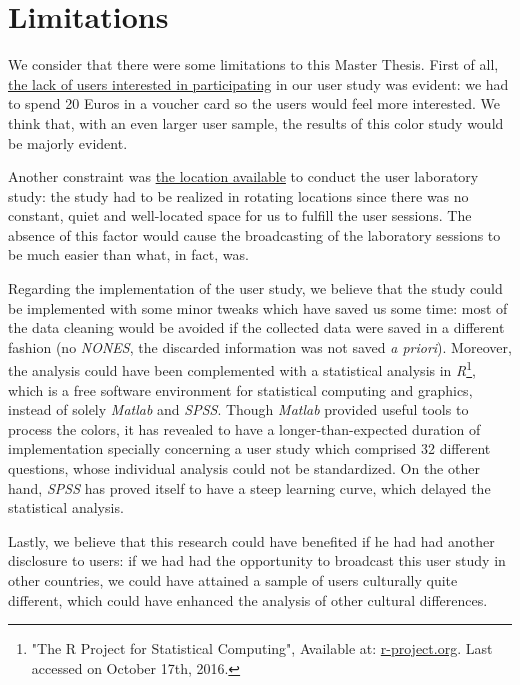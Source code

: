 \section{Limitations}
\label{sec:limitations}
%
We consider that there were some limitations to this Master Thesis. First of all, \ul{the lack of users interested in participating} in our user study was
evident: we had to spend 20 Euros in a voucher card so the users would feel more interested. We think that, with an even larger user sample, the results
of this color study would be majorly evident. \par
%
Another constraint was \ul{the location available} to conduct the user laboratory study: the study had to be realized in rotating locations since there was
no constant, quiet and well-located space for us to fulfill the user sessions. The absence of this factor would cause the broadcasting of the laboratory
sessions to be much easier than what, in fact, was. \par
%
Regarding the implementation of the user study, we believe that the study could be implemented with some minor tweaks which have saved us some time: most
of the data cleaning would be avoided if the collected data were saved in a different fashion (no \emph{NONES}, the discarded information was not saved
\emph{a priori}). Moreover, the analysis could have been complemented with a statistical analysis in \emph{R}\footnote{"The R Project for Statistical Computing", Available at:
\url{r-project.org}. Last accessed on October 17th, 2016.}, which is a free software environment for statistical computing and graphics, instead of solely
\emph{Matlab} and \emph{SPSS}. Though \emph{Matlab} provided useful tools to process the colors, it has revealed to have a longer-than-expected duration of implementation
specially concerning a user study which comprised 32 different questions, whose individual analysis could not be standardized. On the other hand, \emph{SPSS}
has proved itself to have a steep learning curve, which delayed the statistical analysis. \par
%
Lastly, we believe that this research could have benefited if he had had another disclosure to users: if we had had the opportunity to broadcast this user
study in other countries, we could have attained a sample of users culturally quite different, which could have enhanced the analysis of other cultural
differences.
%

